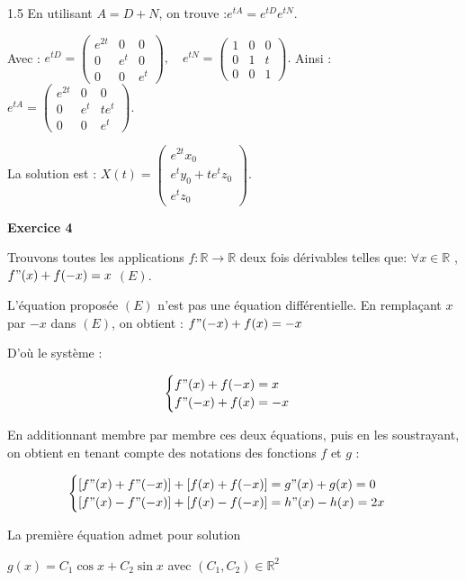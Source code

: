 \documentclass[12pt]{article}
\begin{document}
\begin{spacing}{1.5}
En utilisant $A = D + N$, on trouve :$
e^{tA} = e^{tD}e^{tN}.
$

Avec :
$
e^{tD} = \begin{pmatrix}
e^{2t} & 0 & 0 \\ 
0 & e^t & 0 \\ 
0 & 0 & e^t
\end{pmatrix}, \quad
e^{tN} = \begin{pmatrix}
1 & 0 & 0 \\ 
0 & 1 & t \\ 
0 & 0 & 1
\end{pmatrix}.
$ 
Ainsi :
$
e^{tA} = \begin{pmatrix}
e^{2t} & 0 & 0 \\ 
0 & e^t & te^t \\ 
0 & 0 & e^t
\end{pmatrix}.
$

La solution est :
$
X(t) = \begin{pmatrix}
e^{2t}x_0 \\ 
e^ty_0 + te^tz_0 \\ 
e^tz_0
\end{pmatrix}.
$


\medskip\textbf{Exercice 4}

Trouvons toutes les applications $f :\mathbb{R} \longrightarrow \mathbb{R}$ deux fois dérivables telles que: 
$\forall x \in \mathbb{R}$ , $f"(x) + f(-x) = x$ $(E)$.

L'équation proposée $(E)$ n'est pas une équation différentielle.
En remplaçant $x$ par $-x$ dans $(E)$, on obtient : $f"(-x) + f(x) = -x$

D'où le système :

\[
\begin{cases}
f"(x) + f(-x) = x\\
f"(-x) + f(x) = -x
\end{cases}
\]

En additionnant membre par membre ces deux équations, puis en les soustrayant, on obtient en tenant compte des notations des fonctions $f$ et $g$ : 

\[
\begin{cases}
[f"(x)+f"(-x)]+[f(x)+f(-x)] =g"(x) + g(x) =0\\
[f"(x)-f"(-x)]+[f(x)-f(-x)] =h"(x)-h(x)=2x
\end{cases}
\]

La première équation admet pour solution

 $g(x) = C_1\cos x + C_2\sin x$ avec $(C_1,C_2 )\in \mathbb{R}^2$


\end{spacing}
\end{document}
